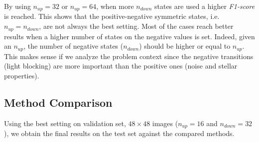 By using $n_{up}=32$ or $n_{up}=64$, when more $n_{down}$ states are used a higher \textit{F1-score} is reached.
This shows that the positive-negative symmetric states, i.e. $n_{up}=n_{down}$, are not always the best setting.
Most of the cases reach better results when a higher number of states on the negative values is set.
Indeed, given an $n_{up}$, the number of negative states ($n_{down}$) should be higher or equal to $n_{up}$. 
This makes sense if we analyze the problem context since the negative transitions (light blocking) are more important than the positive ones (noise and stellar properties).

\subsection{Method Comparison}
Using the best setting on validation set, $48\times 48$ images ($n_{up} = 16 $ and $n_{down} = 32$), we obtain the final results on the test set against the compared methods.

